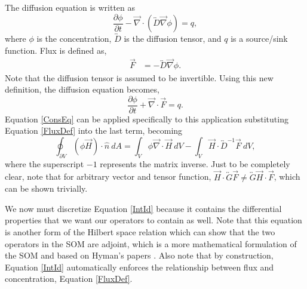 \documentclass[11pt,letterpaper,oneside,notitlepage]{article}	%
\newcommand{\pd}[2]{\frac{\partial #1}{\partial #2}}	%
\newcommand{\tensor}{\overleftrightarrow}		%
\newcommand{\del}{\vec\nabla}				%
\newcommand{\eq}[1]{Equation \eqref{#1}}		%
\numberwithin{equation}{section}				%
\begin{document}
The diffusion equation is written as
\begin{equation}
\pd{\phi}{t}-\del\cdot(\tensor D \del \phi) = q,
\end{equation}
where $\phi$ is the concentration, $\tensor D$ is the diffusion tensor, and $q$ is a source/sink function.  Flux is defined as,
\begin{align}
\vec F &= -\tensor D\del\phi \label{FluxDef}.
\end{align}
Note that the diffusion tensor is assumed to be invertible. Using this new definition, the diffusion equation becomes,
\begin{equation}
\pd{\phi}{t}+\del\cdot\vec F = q\label{DifEq}.
\end{equation}
\eq{ConsEq} can be applied specifically to this application substituting \eq{FluxDef} into the last term, becoming
\begin{equation}
\oint_{\partial V}(\phi\vec H)\cdot\hat n\ dA = \int_V\phi\del\cdot\vec H\ dV - \int_V\vec H\cdot\tensor D^{-1}\vec F\ dV\label{IntId},
\end{equation}
where the superscript $-1$ represents the matrix inverse. Just to be completely clear, note that for arbitrary vector and tensor function, $\vec H\cdot\tensor G\vec F \neq \tensor G\vec H\cdot\vec F$, which can be shown trivially.

We now must discretize \eq{IntId} because it contains the differential properties that we want our operators to contain as well.  Note that this equation is another form of the Hilbert space relation which can show that the two operators in the SOM are adjoint, which is a more mathematical formulation of the SOM and based on Hyman's papers \cite{Hyman1997, Hyman1998, Hyman2002, Hyman2004}.  Also note that by construction, \eq{IntId} automatically enforces the relationship between flux and concentration, \eq{FluxDef}. 

\end{document}
